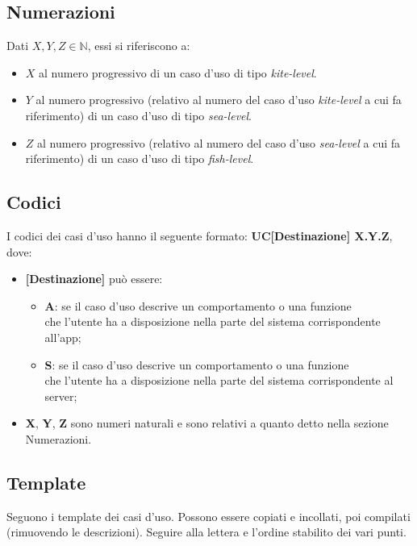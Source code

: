 \documentclass[a4paper, oneside]{article} %
\begin{document}
\subsection{Numerazioni}
Dati $X, Y, Z \in \mathbb{N}$, essi si riferiscono a:
\begin{itemize}
	\item $X$ al numero progressivo di un caso d'uso di tipo \textit{kite-level}.
	\item $Y$ al numero progressivo (relativo al numero del caso d'uso \textit{kite-level} a cui fa riferimento) di un caso d'uso di tipo \textit{sea-level}.
	\item $Z$ al numero progressivo (relativo al numero del caso d'uso \textit{sea-level} a cui fa riferimento) di un caso d'uso di tipo \textit{fish-level}.
\end{itemize}

\subsection{Codici}
I codici dei casi d'uso hanno il seguente formato: \textbf{UC[Destinazione] X.Y.Z}, dove:
\begin{itemize}
	\item \textbf{[Destinazione]} può essere:
		\begin{itemize}
			\item \textbf{A}: se il caso d’uso descrive un comportamento o una funzione \\che l’utente ha a disposizione nella parte del sistema corrispondente all’app;
			\item \textbf{S}: se il caso d’uso descrive un comportamento o una funzione \\che l’utente ha a disposizione nella parte del sistema corrispondente al server;
		\end{itemize}
	\item \textbf{X}, \textbf{Y}, \textbf{Z} sono numeri naturali e sono relativi a quanto detto nella sezione Numerazioni.
\end{itemize}

\subsection{Template}
Seguono i template dei casi d'uso. Possono essere copiati e incollati, poi compilati (rimuovendo le descrizioni). Seguire alla lettera e l'ordine stabilito dei vari punti.
\end{document}
